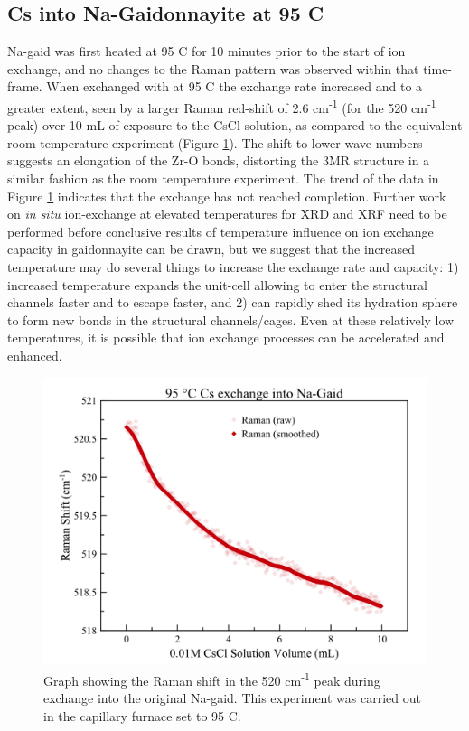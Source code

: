 \documentclass[journal=acsodf,manuscript=article]{achemso}
\begin{document}
\subsection{Cs into Na-Gaidonnayite at 95 \degree C}
{\label{sec_cs_na_gaid_95c}}  %

Na-gaid was first heated at 95 \degree C for 10 minutes prior to
the start of ion exchange, and no changes to the Raman pattern was
observed within that time-frame.  When exchanged with
 at 95 \degree C the exchange rate increased
and to a greater extent, seen by a larger Raman red-shift of 2.6
cm\textsuperscript{-1} (for the 520 cm\textsuperscript{-1} peak) over 10
mL of exposure to the CsCl solution, as compared to the equivalent room
temperature experiment (Figure {\ref{fig_cs_na_gaid_95c}}).
The shift to lower wave-numbers suggests an elongation of the Zr-O
bonds, distorting the 3MR structure in a similar fashion as the room
temperature experiment. The trend of the data in
Figure {\ref{fig_cs_na_gaid_95c}} indicates that the exchange has
not reached completion.  Further work on \emph{in situ} ion-exchange at
elevated temperatures for XRD and XRF need to be performed before
conclusive results of temperature influence on ion exchange capacity in
gaidonnayite can be drawn, but we suggest that the increased temperature
may do several things to increase the exchange rate and capacity: 1)
increased temperature expands the unit-cell allowing
 to enter the structural channels faster
and  to escape faster, and 2) 
can rapidly shed its hydration sphere to form new 
bonds in the structural channels/cages.  Even at these relatively low
temperatures, it is possible that ion exchange processes can be
accelerated and enhanced. 


\begin{figure}[h!]   %
\begin{center}
\includegraphics[width=0.70\columnwidth]{figures/Cs_into_Na-gaid_at_95C.png} 
\caption{{Graph showing the Raman shift in the 520 cm\textsuperscript{-1} peak
during  exchange into the original Na-gaid. This
experiment was carried out in the capillary furnace set
to 95 \degree C.
{\label{fig_cs_na_gaid_95c}}%
}}
\end{center}
\end{figure}
\end{document}
